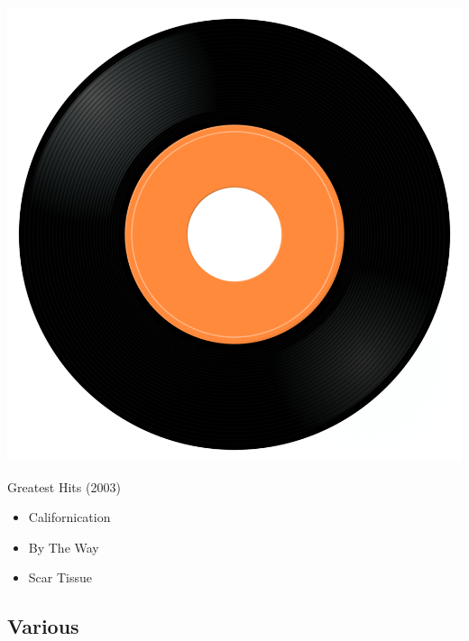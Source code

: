 \begin{minipage}[t]{0.25\textwidth}
\captionsetup{type=figure}
\includegraphics[width=\textwidth]{Images/cover.png}
\caption*{Greatest Hits (2003)}
\end{minipage}
\begin{minipage}[t]{0.25\textwidth}\vspace{0pt}
\begin{itemize}[nosep,leftmargin=1em,labelwidth=*,align=left]
	\setlength{\itemsep}{0pt}
	\item Californication 
	\item By The Way
	\item Scar Tissue
\end{itemize}
\end{minipage}

\subsection{Various}

